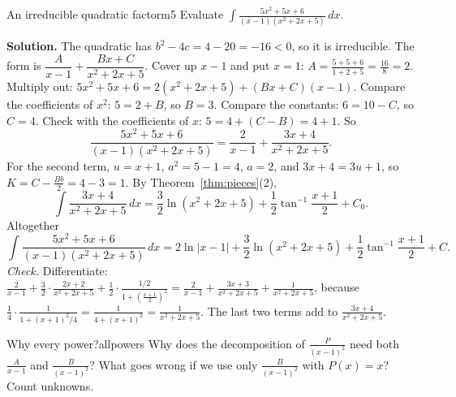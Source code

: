 \documentclass[11pt]{article}
\begin{document}
\begin{exmp}{An irreducible quadratic factor}{m5}
Evaluate $\displaystyle\int\frac{5x^2+5x+6}{(x-1)(x^2+2x+5)}\,dx$.

\textbf{Solution.} The quadratic has $b^2-4c=4-20=-16<0$, so it is irreducible. The form is $\dfrac A{x-1}+\dfrac{Bx+C}{x^2+2x+5}$. Cover up $x-1$ and put $x=1$: $A=\frac{5+5+6}{1+2+5}=\frac{16}8=2$. Multiply out: $5x^2+5x+6=2(x^2+2x+5)+(Bx+C)(x-1)$. Compare the coefficients of $x^2$: $5=2+B$, so $B=3$. Compare the constants: $6=10-C$, so $C=4$. Check with the coefficients of $x$: $5=4+(C-B)=4+1$. So
\[\frac{5x^2+5x+6}{(x-1)(x^2+2x+5)}=\frac2{x-1}+\frac{3x+4}{x^2+2x+5}.\]
For the second term, $u=x+1$, $a^2=5-1=4$, $a=2$, and $3x+4=3u+1$, so $K=C-\frac{Bb}2=4-3=1$. By Theorem~\ref{thm:pieces}(2),
\[\int\frac{3x+4}{x^2+2x+5}\,dx=\frac32\ln\left(x^2+2x+5\right)+\frac12\tan^{-1}\frac{x+1}2+C_0 .\]
Altogether
\[\int\frac{5x^2+5x+6}{(x-1)(x^2+2x+5)}\,dx=2\ln\lvert x-1\rvert+\frac32\ln\left(x^2+2x+5\right)+\frac12\tan^{-1}\frac{x+1}2+C .\]
\emph{Check.} Differentiate: $\frac2{x-1}+\frac32\cdot\frac{2x+2}{x^2+2x+5}+\frac12\cdot\frac{1/2}{1+\left(\frac{x+1}2\right)^2}=\frac2{x-1}+\frac{3x+3}{x^2+2x+5}+\frac{1}{x^2+2x+5}$, because $\frac14\cdot\frac{1}{1+(x+1)^2/4}=\frac1{4+(x+1)^2}=\frac1{x^2+2x+5}$. The last two terms add to $\frac{3x+4}{x^2+2x+5}$.
\end{exmp}

\begin{think}{Why every power?}{allpowers}
Why does the decomposition of $\frac P{(x-1)^2}$ need both $\frac A{x-1}$ and $\frac B{(x-1)^2}$? What goes wrong if we use only $\frac B{(x-1)^2}$ with $P(x)=x$? Count unknowns.
\end{think}
\end{document}
